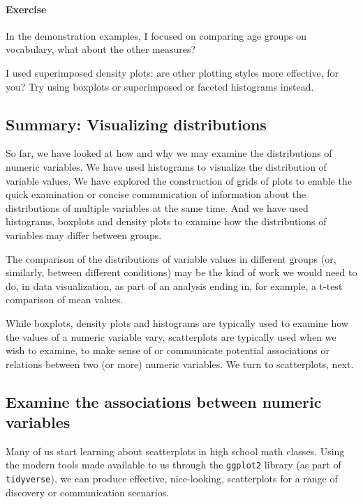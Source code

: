 \documentclass[
  letterpaper,
  DIV=11,
  numbers=noendperiod]{scrreprt}
\let\oldparagraph\paragraph
\renewcommand{\paragraph}[1]{\oldparagraph{#1}\mbox{}}
\begin{document}
\hypertarget{exercise-2}{%
\paragraph{Exercise}\label{exercise-2}}

In the demonstration examples, I focused on comparing age groups on
vocabulary, what about the other measures?

I used superimposed density plots: are other plotting styles more
effective, for you? Try using boxplots or superimposed or faceted
histograms instead.

\hypertarget{sec-summary-distributions}{%
\subsection{Summary: Visualizing
distributions}\label{sec-summary-distributions}}

So far, we have looked at how and why we may examine the distributions
of numeric variables. We have used histograms to visualize the
distribution of variable values. We have explored the construction of
grids of plots to enable the quick examination or concise communication
of information about the distributions of multiple variables at the same
time. And we have used histograms, boxplots and density plots to examine
how the distributions of variables may differ between groups.

The comparison of the distributions of variable values in different
groups (or, similarly, between different conditions) may be the kind of
work we would need to do, in data visualization, as part of an analysis
ending in, for example, a t-test comparison of mean values.

While boxplots, density plots and histograms are typically used to
examine how the values of a numeric variable vary, scatterplots are
typically used when we wish to examine, to make sense of or communicate
potential associations or relations between two (or more) numeric
variables. We turn to scatterplots, next.

\hypertarget{sec-examine-associations}{%
\subsection{Examine the associations between numeric
variables}\label{sec-examine-associations}}

Many of us start learning about scatterplots in high school math
classes. Using the modern tools made available to us through the
\texttt{ggplot2} library (as part of \texttt{tidyverse}), we can produce
effective, nice-looking, scatterplots for a range of discovery or
communication scenarios.
\end{document}

